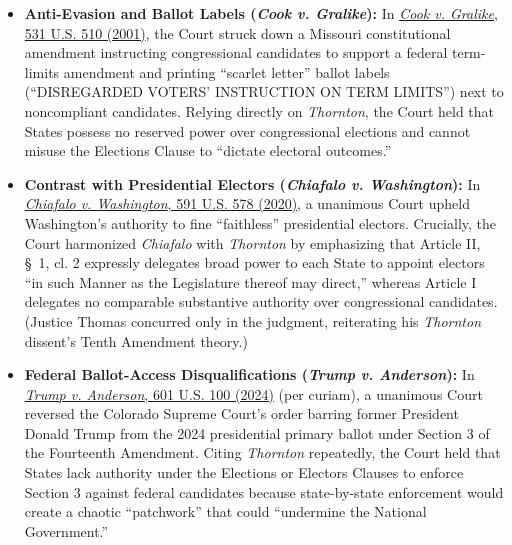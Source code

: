 \documentclass[12pt]{article}
\begin{document}
\begin{itemize}
    \item \textbf{Anti-Evasion and Ballot Labels (\textit{Cook v. Gralike}):} In \href{https://supreme.justia.com/cases/federal/us/531/510/}{\textit{Cook v. Gralike}, 531 U.S. 510 (2001)}, the Court struck down a Missouri constitutional amendment instructing congressional candidates to support a federal term-limits amendment and printing ``scarlet letter'' ballot labels (``DISREGARDED VOTERS' INSTRUCTION ON TERM LIMITS'') next to noncompliant candidates. Relying directly on \textit{Thornton}, the Court held that States possess no reserved power over congressional elections and cannot misuse the Elections Clause to ``dictate electoral outcomes.''
    \item \textbf{Contrast with Presidential Electors (\textit{Chiafalo v. Washington}):} In \href{https://supreme.justia.com/cases/federal/us/591/19-465/}{\textit{Chiafalo v. Washington}, 591 U.S. 578 (2020)}, a unanimous Court upheld Washington's authority to fine ``faithless'' presidential electors. Crucially, the Court harmonized \textit{Chiafalo} with \textit{Thornton} by emphasizing that Article II, \S~1, cl. 2 expressly delegates broad power to each State to appoint electors ``in such Manner as the Legislature thereof may direct,'' whereas Article I delegates no comparable substantive authority over congressional candidates. (Justice Thomas concurred only in the judgment, reiterating his \textit{Thornton} dissent's Tenth Amendment theory.)
    \item \textbf{Federal Ballot-Access Disqualifications (\textit{Trump v. Anderson}):} In \href{https://supreme.justia.com/cases/federal/us/601/23-719/}{\textit{Trump v. Anderson}, 601 U.S. 100 (2024)} (per curiam), a unanimous Court reversed the Colorado Supreme Court's order barring former President Donald Trump from the 2024 presidential primary ballot under Section 3 of the Fourteenth Amendment. Citing \textit{Thornton} repeatedly, the Court held that States lack authority under the Elections or Electors Clauses to enforce Section 3 against federal candidates because state-by-state enforcement would create a chaotic ``patchwork'' that could ``undermine the National Government.''
\end{itemize}
\end{document}
